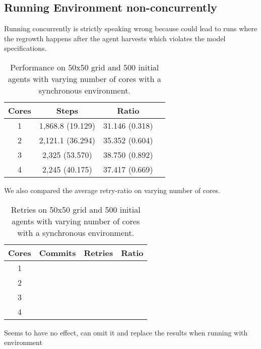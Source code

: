 \subsection{Running Environment non-concurrently}
Running concurrently is strictly speaking wrong because could lead to runs where the regrowth happens after the agent harvests which violates the model specifications. 

\begin{table}
	\centering
  	\begin{tabular}{ c || c | c | c }
        Cores & Steps            & Ratio           \\ \hline \hline 
    	1     & 1,868.8 (19.129) & 31.146 (0.318) \\ \hline
   		2     & 2,121.1 (36.294) & 35.352 (0.604) \\ \hline
   		3     & 2,325 (53.570)   & 38.750 (0.892) \\ \hline
   		4     & 2,245 (40.175)   & 37.417 (0.669) \\ \hline \hline
   	\end{tabular}
  	
  	\caption{Performance on 50x50 grid and 500 initial agents with varying number of cores with a synchronous environment.}
	\label{tab:naive_results_syncenv_time}
\end{table}

We also compared the average retry-ratio on varying number of cores.

\begin{table}
	\centering
  	\begin{tabular}{ c || c | c | c }
        Cores & Commits           & Retries            & Ratio \\ \hline \hline 
    	1     &                   &                    &  \\ \hline
   		2     &                   &                    &  \\ \hline
   		3     &                   &                    &  \\ \hline
   		4     &                   &                    &  \\ \hline
   	\end{tabular}
  	
  	\caption{Retries on 50x50 grid and 500 initial agents with varying number of cores with a synchronous environment.}
	\label{tab:naive_results_syncenv_retries}
\end{table}

Seems to have no effect, can omit it and replace the results when running with environment 

